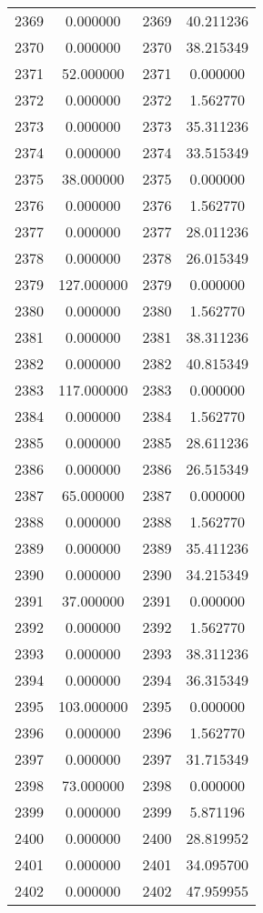 \documentclass[12pt]{article}
\begin{document}
\begin{longtable}{@{}cccc@{}}
2369 & 0.000000 & 2369 & 40.211236 \\
2370 & 0.000000 & 2370 & 38.215349 \\
2371 & 52.000000 & 2371 & 0.000000 \\
2372 & 0.000000 & 2372 & 1.562770 \\
2373 & 0.000000 & 2373 & 35.311236 \\
2374 & 0.000000 & 2374 & 33.515349 \\
2375 & 38.000000 & 2375 & 0.000000 \\
2376 & 0.000000 & 2376 & 1.562770 \\
2377 & 0.000000 & 2377 & 28.011236 \\
2378 & 0.000000 & 2378 & 26.015349 \\
2379 & 127.000000 & 2379 & 0.000000 \\
2380 & 0.000000 & 2380 & 1.562770 \\
2381 & 0.000000 & 2381 & 38.311236 \\
2382 & 0.000000 & 2382 & 40.815349 \\
2383 & 117.000000 & 2383 & 0.000000 \\
2384 & 0.000000 & 2384 & 1.562770 \\
2385 & 0.000000 & 2385 & 28.611236 \\
2386 & 0.000000 & 2386 & 26.515349 \\
2387 & 65.000000 & 2387 & 0.000000 \\
2388 & 0.000000 & 2388 & 1.562770 \\
2389 & 0.000000 & 2389 & 35.411236 \\
2390 & 0.000000 & 2390 & 34.215349 \\
2391 & 37.000000 & 2391 & 0.000000 \\
2392 & 0.000000 & 2392 & 1.562770 \\
2393 & 0.000000 & 2393 & 38.311236 \\
2394 & 0.000000 & 2394 & 36.315349 \\
2395 & 103.000000 & 2395 & 0.000000 \\
2396 & 0.000000 & 2396 & 1.562770 \\
2397 & 0.000000 & 2397 & 31.715349 \\
2398 & 73.000000 & 2398 & 0.000000 \\
2399 & 0.000000 & 2399 & 5.871196 \\
2400 & 0.000000 & 2400 & 28.819952 \\
2401 & 0.000000 & 2401 & 34.095700 \\
2402 & 0.000000 & 2402 & 47.959955 \\

\end{longtable}
\end{document}
